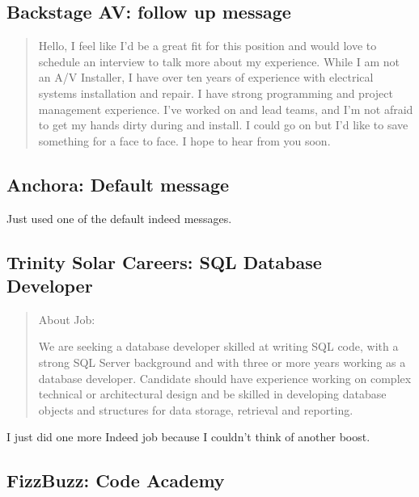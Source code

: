 \documentclass[
	letterpaper, %
	12pt, %
]{CSSullivanBusinessReport}
\begin{document}

\subsection[Backstage AV]{Backstage AV: follow up message}

\begin{quote}
	Hello, I feel like I'd be a great fit for this position and would love to schedule an interview to talk more about my experience. While I am not an A/V Installer, I have over ten years of experience with electrical systems installation and repair. I have strong programming and project management experience. I've worked on and lead teams, and I'm not afraid to get my hands dirty during and install. I could go on but I'd like to save something for a face to face. I hope to hear from you soon. 
\end{quote}


\subsection[Anchora]{Anchora: Default message}

Just used one of the default indeed messages. 


\subsection[Trinity Solar Careers]{Trinity Solar Careers: SQL Database Developer}

\begin{quote}
	About Job:

	We are seeking a database developer skilled at writing SQL code, with a strong SQL Server background and with three or more years working as a database developer. Candidate should have experience working on complex technical or architectural design and be skilled in developing database objects and structures for data storage, retrieval and reporting.

\end{quote}

I just did one more Indeed job because I couldn't think of another boost. 



\subsection[FizzBuzz]{FizzBuzz: Code Academy}
\end{document}
